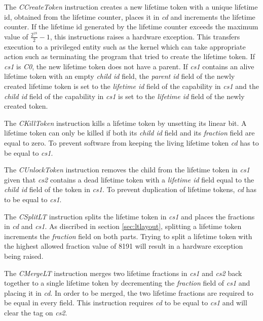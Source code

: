 The \textit{CCreateToken} instruction creates a new lifetime token with a unique lifetime id, obtained from the lifetime counter, places it in \textit{cd} and increments the lifetime counter. If the lifetime id generated by the lifetime counter exceeds the maximum value of $\frac{2^{18}}{2} - 1$, this instructions raises a hardware exception. This transfers execution to a privileged entity such as the kernel which can take appropriate action such as terminating the program that tried to create the lifetime token. If \textit{cs1} is \textit{C0}, the new lifetime token does not have a parent. If \textit{cs1} contains an alive lifetime token with an empty \textit{child id} field, the \textit{parent id} field of the newly created lifetime token is set to the \textit{lifetime id} field of the capability in \textit{cs1} and the \textit{child id} field of the capability in \textit{cs1} is set to the \textit{lifetime id} field of the newly created token.

The \textit{CKillToken} instruction kills a lifetime token by unsetting its linear bit. A lifetime token can only be killed if both its \textit{child id} field and its \textit{fraction} field are equal to zero. To prevent software from keeping the living lifetime token \textit{cd} has to be equal to \textit{cs1}.

The \textit{CUnlockToken} instruction removes the child from the lifetime token in \textit{cs1} given that \textit{cs2} contains a dead lifetime token with a \textit{lifetime id} field equal to the \textit{child id} field of the token in \textit{cs1}. To prevent duplication of lifetime tokens, \textit{cd} has to be equal to \textit{cs1}.

The \textit{CSplitLT} instruction splits the lifetime token in \textit{cs1} and places the fractions in \textit{cd} and \textit{cs1}. As discribed in section \ref{sec:ltlayout}, splitting a lifetime token increments the \textit{fraction} field on both parts. Trying to split a lifetime token with the highest allowed fraction value of 8191 will result in a hardware exception being raised.

The \textit{CMergeLT} instruction merges two lifetime fractions in \textit{cs1} and \textit{cs2} back together to a single lifetime token by decrementing the \textit{fraction} field of \textit{cs1} and placing it in \textit{cd}. In order to be merged, the two lifetime fractions are required to be equal in every field. This instruction requires \textit{cd} to be equal to \textit{cs1} and will clear the tag on \textit{cs2}.


